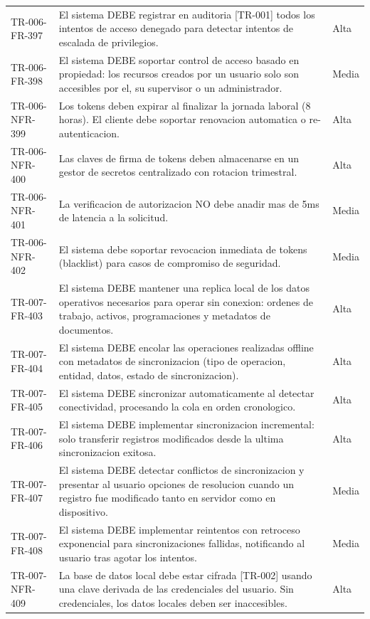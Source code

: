 \begin{longtable}{>{\raggedright\arraybackslash}p{} >{\raggedright\arraybackslash}p{} >{\raggedright\arraybackslash}p{}}
TR-006-FR-397 & El sistema DEBE registrar en auditoria [TR-001] todos los intentos de acceso denegado para detectar intentos de escalada de privilegios. & Alta \\
TR-006-FR-398 & El sistema DEBE soportar control de acceso basado en propiedad: los recursos creados por un usuario solo son accesibles por el, su supervisor o un administrador. & Media \\
TR-006-NFR-399 & Los tokens deben expirar al finalizar la jornada laboral (8 horas). El cliente debe soportar renovacion automatica o re-autenticacion. & Alta \\
TR-006-NFR-400 & Las claves de firma de tokens deben almacenarse en un gestor de secretos centralizado con rotacion trimestral. & Alta \\
TR-006-NFR-401 & La verificacion de autorizacion NO debe anadir mas de 5ms de latencia a la solicitud. & Media \\
TR-006-NFR-402 & El sistema debe soportar revocacion inmediata de tokens (blacklist) para casos de compromiso de seguridad. & Media \\
TR-007-FR-403 & El sistema DEBE mantener una replica local de los datos operativos necesarios para operar sin conexion: ordenes de trabajo, activos, programaciones y metadatos de documentos. & Alta \\
TR-007-FR-404 & El sistema DEBE encolar las operaciones realizadas offline con metadatos de sincronizacion (tipo de operacion, entidad, datos, estado de sincronizacion). & Alta \\
TR-007-FR-405 & El sistema DEBE sincronizar automaticamente al detectar conectividad, procesando la cola en orden cronologico. & Alta \\
TR-007-FR-406 & El sistema DEBE implementar sincronizacion incremental: solo transferir registros modificados desde la ultima sincronizacion exitosa. & Alta \\
TR-007-FR-407 & El sistema DEBE detectar conflictos de sincronizacion y presentar al usuario opciones de resolucion cuando un registro fue modificado tanto en servidor como en dispositivo. & Media \\
TR-007-FR-408 & El sistema DEBE implementar reintentos con retroceso exponencial para sincronizaciones fallidas, notificando al usuario tras agotar los intentos. & Media \\
TR-007-NFR-409 & La base de datos local debe estar cifrada [TR-002] usando una clave derivada de las credenciales del usuario. Sin credenciales, los datos locales deben ser inaccesibles. & Alta \\

\end{longtable}
